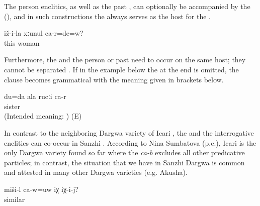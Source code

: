 The person enclitics, as well as the past , can optionally be accompanied by the  (), and in such constructions the  always serves as the host for the  . 


\begin{exe}
	\ex	\label{ex:‎‎‎Are you his wife}
	\gll	iž-i-la	xːunul	ca-r=de=w?\\
		this	woman	\\
	\glt	{}
\end{exe}

Furthermore, the  and the person  or past  need to occur on the same host; they cannot be separated . If in the example below the  at the end is omitted, the clause becomes grammatical with the meaning given in brackets below. 

\begin{exe}
	\ex	\label{ex:It is me who is your sister.}
	\gll	{*} du=da	ala	rucːi	ca-r\\
		{} 		sister	\\
	\glt	(Intended meaning: ) (E)
\end{exe}

In contrast to the neighboring Dargwa variety of Icari \citep[138]{Sumbatova.Mutalov2003}, the  and the interrogative enclitics can co-occur in Sanzhi . According to Nina Sumbatova (p.c.), Icari is the only Dargwa variety found so far where the  \textit{ca-b} excludes all other predicative particles; in contrast, the situation that we have in Sanzhi Dargwa is common and attested in many other Dargwa varieties (e.g. Akusha). 

\begin{exe}
	\ex	\label{ex:Is this similar to himSyntax}
	\gll	miši-l	ca-w=uw	iχ	iχ-i-j?\\
		similar		\tsc{dem.down}	\\
	\glt	{}
\end{exe}

